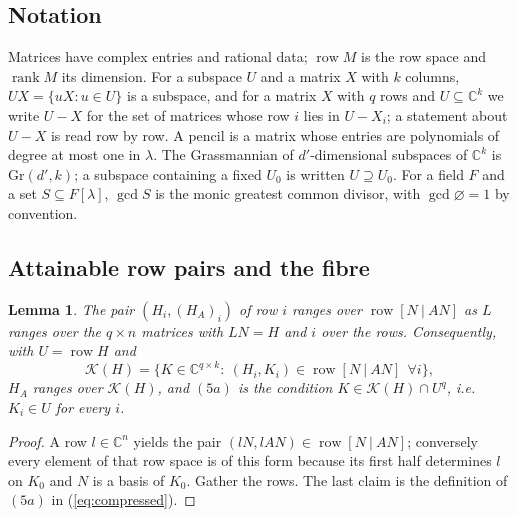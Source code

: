 \documentclass[journal]{IEEEtran}
\theoremstyle{plainn}
\newtheorem{lem}[thm]{Lemma}
\theoremstyle{remark}
\begin{document}
\subsection{Notation}\label{sec:notation}

Matrices have complex entries and rational data; $\operatorname{row}M$ is the row space and
$\operatorname{rank}M$ its dimension. For a subspace $U$ and a matrix $X$ with $k$ columns,
$UX=\{uX:u\in U\}$ is a subspace, and for a matrix $X$ with $q$ rows and $U\subseteq\mathbb C^{k}$ we write
$U-X$ for the set of matrices whose row $i$ lies in $U-X_i$; a statement about $U-X$ is read row by row. A pencil
is a matrix whose entries are polynomials of degree at most one in $\lambda$. The Grassmannian of
$d'$-dimensional subspaces of $\mathbb C^k$ is $\mathrm{Gr}(d',k)$; a subspace containing a fixed
$U_0$ is written $U\supseteq U_0$. For a field $F$ and a set $S\subseteq F[\lambda]$, $\gcd S$ is the
monic greatest common divisor, with $\gcd\varnothing=1$ by convention.

\subsection{Attainable row pairs and the fibre}\label{sec:attainable}

\begin{lem}\label{lem:pair}
The pair $(H_i,(H_A)_i)$ of row $i$ ranges over $\operatorname{row}[N\ |\ AN]$ as $L$ ranges over the
$q\times n$ matrices with $LN=H$ and $i$ over the rows. Consequently, with $U=\operatorname{row}H$
and
\begin{equation}\label{eq:Kset}
\mathcal K(H)=\bigl\{K\in\mathbb C^{q\times k}:\ (H_i,K_i)\in\operatorname{row}[N\ |\ AN]\ \
\forall i\bigr\},
\end{equation}
$H_A$ ranges over $\mathcal K(H)$, and $(5a)$ is the condition $K\in\mathcal K(H)\cap U^{q}$, i.e.\
$K_i\in U$ for every $i$.
\end{lem}

\begin{proof}
A row $l\in\mathbb C^{n}$ yields the pair $(lN,lAN)\in\operatorname{row}[N\ |\ AN]$; conversely every
element of that row space is of this form because its first half determines $l$ on $K_0$ and $N$ is a
basis of $K_0$. Gather the rows. The last claim is the definition of $(5a)$ in
(\ref{eq:compressed}).
\end{proof}
\end{document}

